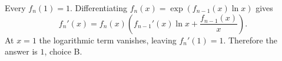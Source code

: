Every $f_n(1)=1$. Differentiating $f_n(x)=\exp(f_{n-1}(x)\ln x)$ gives
\[f_n'(x)=f_n(x)\left(f_{n-1}'(x)\ln x+\dfrac{f_{n-1}(x)}{x}\right).\]
At $x=1$ the logarithmic term vanishes, leaving $f_n'(1)=1$. Therefore the answer is $\boxed1$, choice B.

